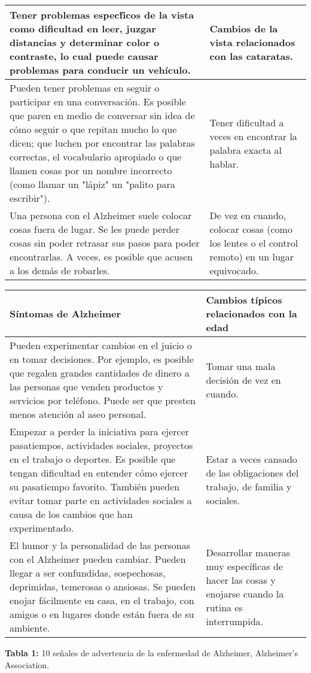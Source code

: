 \documentclass[smallextended, 12pt]{article}
\begin{document}
\begin{center}
\begin{tabular}{|p{10cm}|p{7cm}|}
			Tener problemas espec\'ficos de la vista como dificultad en leer, juzgar distancias y determinar color o contraste, lo cual puede causar problemas para conducir un veh\'iculo.  & Cambios de la vista relacionados con las cataratas.  \\ \hline
			
			Pueden tener problemas en seguir o participar en una conversaci\'on. Es posible que paren en medio de conversar sin idea de c\'omo seguir o que repitan mucho lo que dicen; que luchen por encontrar las palabras correctas, el vocabulario apropiado o que llamen cosas por un nombre incorrecto (como llamar un "l\'apiz" un "palito para escribir"). & Tener dificultad a veces en encontrar la palabra exacta al hablar. \\ \hline
			
			Una persona con el Alzheimer suele colocar cosas fuera de lugar. Se les puede perder cosas sin poder retrasar sus pasos para poder encontrarlas. A veces, es posible que acusen a los dem\'as de robarles. & De vez en cuando, colocar cosas (como los lentes o el control remoto) en un lugar equivocado. \\ \hline
		\end{tabular}
	\end{center}
	
	\begin{center}
	\begin{tabular}{|p{10cm}|p{7cm}|}
		\hline
		\textbf{S\'intomas de Alzheimer }&\textbf{ Cambios t\'ipicos relacionados con la edad} \\
		\hline
		
		Pueden experimentar cambios en el juicio o en tomar decisiones. Por ejemplo, es posible que regalen grandes cantidades de dinero a las personas que venden productos y servicios por tel\'efono. Puede ser que presten menos atenci\'on al aseo personal.  & Tomar una mala decisi\'on de vez en cuando.  \\ \hline
		
		Empezar a perder la iniciativa para ejercer pasatiempos, actividades sociales, proyectos en el trabajo o deportes. Es posible que tengan dificultad en entender c\'omo ejercer su pasatiempo favorito. Tambi\'en pueden evitar tomar parte en actividades sociales a causa de los cambios que han experimentado. & Estar a veces cansado de las obligaciones del trabajo, de familia y sociales. \\ \hline
		
		El humor y la personalidad de las personas con el Alzheimer pueden cambiar. Pueden llegar a ser confundidas, sospechosas, deprimidas, temerosas o ansiosas. Se pueden enojar f\'acilmente en casa, en el trabajo, con amigos o en lugares donde est\'an fuera de su ambiente.  & Desarrollar maneras muy espec\'ificas de hacer las cosas y enojarse cuando la rutina es interrumpida. \\ \hline
	\end{tabular}
		\begin{center}
			\textbf{Tabla 1:} 10 se\~nales de advertencia de la enfermedad de Alzheimer, Alzheimer’s Association. 
		\end{center}
	\end{center}
	
\end{document}
